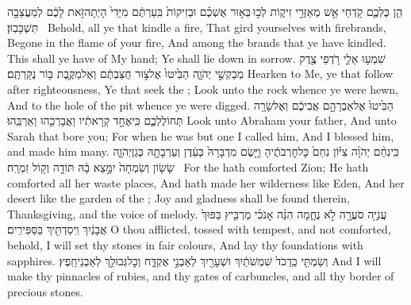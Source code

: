 {הֵ֧ן כֻּלְּכֶ֛ם קֹ֥דְחֵי אֵ֖שׁ מְאַזְּרֵ֣י זִיק֑וֹת לְכ֣וּ \legarmeh  בְּא֣וּר אֶשְׁכֶ֗ם וּבְזִיקוֹת֙ בִּֽעַרְתֶּ֔ם מִיָּדִי֙ הָיְתָה\maqqaf זֹּ֣את לָכֶ֔ם לְמַעֲצֵבָ֖ה תִּשְׁכָּבֽוּן׃ \setuma }
{Behold, all ye that kindle a fire, That gird yourselves with firebrands, Begone in the flame of your fire, And among the brands that ye have kindled. This shall ye have of My hand; Ye shall lie down in sorrow.}
\newperek
{}
{שִׁמְע֥וּ אֵלַ֛י רֹ֥דְפֵי צֶ֖דֶק מְבַקְשֵׁ֣י יְהֹוָ֑ה הַבִּ֙יטוּ֙ אֶל\maqqaf צ֣וּר חֻצַּבְתֶּ֔ם וְאֶל\maqqaf מַקֶּ֥בֶת בּ֖וֹר נֻקַּרְתֶּֽם׃}
{Hearken to Me, ye that follow after righteousness, Ye that seek the \lord; Look unto the rock whence ye were hewn, And to the hole of the pit whence ye were digged.}
{הַבִּ֙יטוּ֙ אֶל\maqqaf אַבְרָהָ֣ם אֲבִיכֶ֔ם וְאֶל\maqqaf שָׂרָ֖ה תְּחוֹלֶלְכֶ֑ם כִּֽי\maqqaf אֶחָ֣ד קְרָאתִ֔יו וַאֲבָרְכֵ֖הוּ וְאַרְבֵּֽהוּ׃}
{Look unto Abraham your father, And unto Sarah that bore you; For when he was but one I called him, And I blessed him, and made him many.}
{כִּֽי\maqqaf נִחַ֨ם יְהֹוָ֜ה צִיּ֗וֹן נִחַם֙ כׇּל\maqqaf חׇרְבֹתֶ֔יהָ וַיָּ֤שֶׂם מִדְבָּרָהּ֙ כְּעֵ֔דֶן וְעַרְבָתָ֖הּ כְּגַן\maqqaf יְהֹוָ֑ה שָׂשׂ֤וֹן וְשִׂמְחָה֙ יִמָּ֣צֵא בָ֔הּ תּוֹדָ֖ה וְק֥וֹל זִמְרָֽה׃ \setuma }
{For the \lord\space hath comforted Zion; He hath comforted all her waste places, And hath made her wilderness like Eden, And her desert like the garden of the \lord; Joy and gladness shall be found therein, Thanksgiving, and the voice of melody.}
\newperek
{}
\label{haft_47}
\setcounter{chap}{54}
\setcounter{verse}{11}
{עֲנִיָּ֥ה סֹעֲרָ֖ה לֹ֣א נֻחָ֑מָה הִנֵּ֨ה אָנֹכִ֜י מַרְבִּ֤יץ בַּפּוּךְ֙ אֲבָנַ֔יִךְ וִֽיסַדְתִּ֖יךְ בַּסַּפִּירִֽים׃}
{O thou afflicted, tossed with tempest, and not comforted, behold, I will set thy stones in fair colours, And lay thy foundations with sapphires.}
{וְשַׂמְתִּ֤י כַּֽדְכֹד֙ שִׁמְשֹׁתַ֔יִךְ וּשְׁעָרַ֖יִךְ לְאַבְנֵ֣י אֶקְדָּ֑ח וְכׇל\maqqaf גְּבוּלֵ֖ךְ לְאַבְנֵי\maqqaf חֵֽפֶץ׃}
{And I will make thy pinnacles of rubies, and thy gates of carbuncles, and all thy border of precious stones.}
